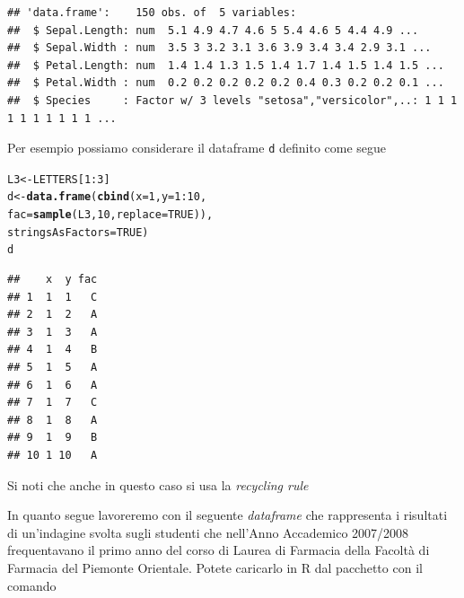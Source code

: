 \documentclass[onecolumn,12pt]{book}\usepackage[]{graphicx}\usepackage[]{color}
\makeatletter
\newcommand{\hlnum}[1]{\textcolor[rgb]{0.686,0.059,0.569}{#1}}%
\newcommand{\hlopt}[1]{\textcolor[rgb]{0,0,0}{#1}}%
\newcommand{\hlstd}[1]{\textcolor[rgb]{0.345,0.345,0.345}{#1}}%
\newcommand{\hlkwb}[1]{\textcolor[rgb]{0.69,0.353,0.396}{#1}}%
\newcommand{\hlkwc}[1]{\textcolor[rgb]{0.333,0.667,0.333}{#1}}%
\newcommand{\hlkwd}[1]{\textcolor[rgb]{0.737,0.353,0.396}{\textbf{#1}}}%
\newenvironment{kframe}{%
 \def\at@end@of@kframe{}%
 \ifinner\ifhmode%
  \def\at@end@of@kframe{\end{minipage}}%
  \begin{minipage}{\columnwidth}%
 \fi\fi%
 \def\FrameCommand##1{\hskip\@totalleftmargin \hskip-\fboxsep
 \colorbox{shadecolor}{##1}\hskip-\fboxsep
     \hskip-\linewidth \hskip-\@totalleftmargin \hskip\columnwidth}%
 \MakeFramed {\advance\hsize-\width
   \@totalleftmargin\z@ \linewidth\hsize
   \@setminipage}}%
 {\par\unskip\endMakeFramed%
 \at@end@of@kframe}
\newenvironment{knitrout}{}{} %
\makeatother
\begin{document}
\small
\begin{knitrout}
\color{fgcolor}\begin{kframe}
\begin{verbatim}
## 'data.frame':	150 obs. of  5 variables:
##  $ Sepal.Length: num  5.1 4.9 4.7 4.6 5 5.4 4.6 5 4.4 4.9 ...
##  $ Sepal.Width : num  3.5 3 3.2 3.1 3.6 3.9 3.4 3.4 2.9 3.1 ...
##  $ Petal.Length: num  1.4 1.4 1.3 1.5 1.4 1.7 1.4 1.5 1.4 1.5 ...
##  $ Petal.Width : num  0.2 0.2 0.2 0.2 0.2 0.4 0.3 0.2 0.2 0.1 ...
##  $ Species     : Factor w/ 3 levels "setosa","versicolor",..: 1 1 1 1 1 1 1 1 1 1 ...
\end{verbatim}
\end{kframe}
\end{knitrout}
\normalsize
Per esempio possiamo considerare il dataframe \texttt{d} definito come segue 
\begin{knitrout}
\color{fgcolor}\begin{kframe}
\begin{alltt}
\hlstd{L3} \hlkwb{<-} \hlstd{LETTERS[}\hlnum{1}\hlopt{:}\hlnum{3}\hlstd{]}
\hlstd{d} \hlkwb{<-} \hlkwd{data.frame}\hlstd{(}\hlkwd{cbind}\hlstd{(}\hlkwc{x}\hlstd{=}\hlnum{1}\hlstd{,} \hlkwc{y}\hlstd{=}\hlnum{1}\hlopt{:}\hlnum{10}\hlstd{,}
\hlkwc{fac}\hlstd{=}\hlkwd{sample}\hlstd{(L3,} \hlnum{10}\hlstd{,} \hlkwc{replace}\hlstd{=}\hlnum{TRUE}\hlstd{)),}
\hlkwc{stringsAsFactors}\hlstd{=}\hlnum{TRUE}\hlstd{)}
\hlstd{d}
\end{alltt}
\begin{verbatim}
##    x  y fac
## 1  1  1   C
## 2  1  2   A
## 3  1  3   A
## 4  1  4   B
## 5  1  5   A
## 6  1  6   A
## 7  1  7   C
## 8  1  8   A
## 9  1  9   B
## 10 1 10   A
\end{verbatim}
\end{kframe}
\end{knitrout}
Si noti che anche in questo caso si usa la \emph{recycling rule}

In quanto segue lavoreremo con il seguente \emph{dataframe} che rappresenta i risultati di un'indagine svolta sugli studenti che nell'Anno Accademico 2007/2008 frequentavano il primo anno del corso di Laurea di Farmacia della Facolt\`a di Farmacia del Piemonte Orientale. Potete caricarlo  in {\textsf R} dal pacchetto con il comando
\end{document}
